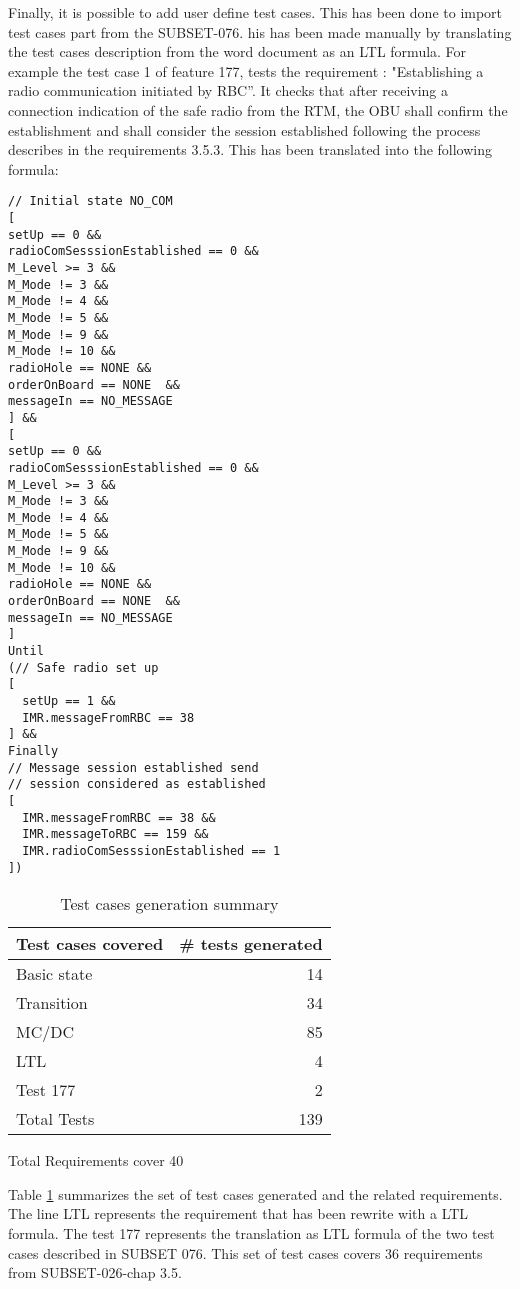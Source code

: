 Finally, it is possible to add user define test cases. This has been
done to import test cases part from the SUBSET-076. his has been made
manually by translating the test cases description from the word
document as an LTL formula. 
For example the test case 1 of feature  177, tests the requirement :
"Establishing a radio communication initiated by RBC''.  It checks
that after receiving a connection indication of the safe radio
from the RTM, the OBU  shall confirm the establishment and shall
consider the session established following the process describes in
the requirements 3.5.3. This has been translated into the following
formula:
\begin{multicols}{2}
\begin{verbatim}
// Initial state NO_COM
[
setUp == 0 &&
radioComSesssionEstablished == 0 && 
M_Level >= 3 && 
M_Mode != 3 &&
M_Mode != 4 &&
M_Mode != 5 &&
M_Mode != 9 &&
M_Mode != 10 &&
radioHole == NONE &&
orderOnBoard == NONE  &&
messageIn == NO_MESSAGE
] && 
[
setUp == 0 &&
radioComSesssionEstablished == 0 && 
M_Level >= 3 && 
M_Mode != 3 &&
M_Mode != 4 &&
M_Mode != 5 &&
M_Mode != 9 &&
M_Mode != 10 &&
radioHole == NONE &&
orderOnBoard == NONE  &&
messageIn == NO_MESSAGE 
]  
Until
(// Safe radio set up
[
  setUp == 1 &&
  IMR.messageFromRBC == 38 
] &&
Finally 
// Message session established send 
// session considered as established
[
  IMR.messageFromRBC == 38 &&
  IMR.messageToRBC == 159 &&
  IMR.radioComSesssionEstablished == 1
])
\end{verbatim}
\end{multicols}
\begin{table}[htbp]
\centering
\begin{tabular}{lr}\toprule
  Test cases covered & \# tests generated  \\\midrule
  Basic state & 14 \\
  Transition & 34 \\
  MC/DC & 85 \\
  LTL & 4 \\
  Test 177 & 2 \\ \midrule
  Total Tests& 139\\\bottomrule
\end{tabular}

\raggedleft Total Requirements cover 40
\caption{\label{tbl:test_summary} Test cases generation summary}
\end{table}

Table \ref{tbl:test_summary} summarizes the set of test cases
generated and the related requirements. The line LTL represents the
requirement that has been rewrite with a LTL formula. The test 177
represents the translation as LTL formula of the two test cases described
in SUBSET 076. This set of test cases covers 36 requirements from SUBSET-026-chap 3.5.



